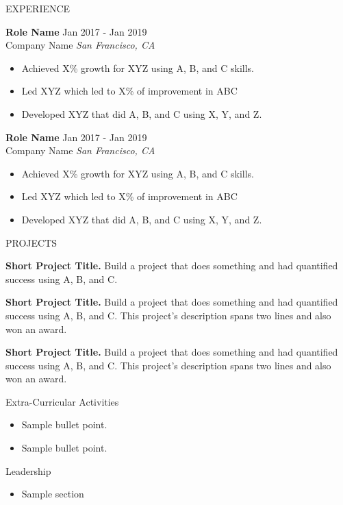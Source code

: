 \documentclass{resume} %
\begin{document}
\begin{rSection}{EXPERIENCE}

\textbf{Role Name} \hfill Jan 2017 - Jan 2019\\
Company Name \hfill \textit{San Francisco, CA}
 \begin{itemize}
    \itemsep -3pt {}
     \item Achieved X\% growth for XYZ using A, B, and C skills.
     \item Led XYZ which led to X\% of improvement in ABC
    \item Developed XYZ that did A, B, and C using X, Y, and Z.
 \end{itemize}

\textbf{Role Name} \hfill Jan 2017 - Jan 2019\\
Company Name \hfill \textit{San Francisco, CA}
 \begin{itemize}
    \itemsep -3pt {}
     \item Achieved X\% growth for XYZ using A, B, and C skills.
     \item Led XYZ which led to X\% of improvement in ABC
    \item Developed XYZ that did A, B, and C using X, Y, and Z.
 \end{itemize}

\end{rSection}


\begin{rSection}{PROJECTS}
\vspace{-1.25em}
\item \textbf{Short Project Title.} {Build a project that does something and had quantified success using A, B, and C.}
\item \textbf{Short Project Title.} {Build a project that does something and had quantified success using A, B, and C. This project's description spans two lines and also won an award.}
\item \textbf{Short Project Title.} {Build a project that does something and had quantified success using A, B, and C. This project's description spans two lines and also won an award.}
\end{rSection}

\begin{rSection}{Extra-Curricular Activities}
\begin{itemize}
    \item 	Sample bullet point.
    \item	Sample bullet point.
\end{itemize}


\end{rSection}

\begin{rSection}{Leadership}
\begin{itemize}
    \item Sample section
\end{itemize}


\end{rSection}
\end{document}
